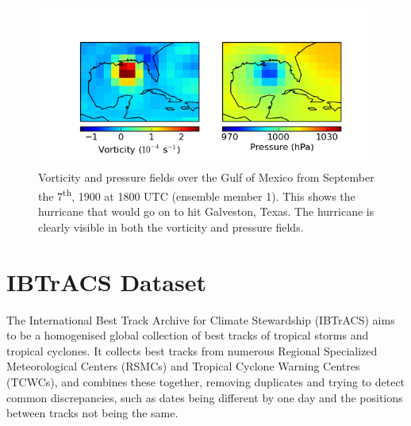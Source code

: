 \documentclass[pdftex,12pt,a4paper]{report}
\newcommand{\ts}{\textsuperscript}
\begin{document}
\begin{figure}[ht!]
    \centering
    \includegraphics[width=\textwidth]{figures/galveston_1900-9-7_18-00_em0}
    \caption{Vorticity and pressure fields over the Gulf of Mexico from September the 7\ts{th}, 1900
        at 1800 UTC (ensemble member 1). This shows the hurricane that would go on to hit
        Galveston, Texas. The hurricane is clearly visible in both the vorticity and pressure fields.}
    \label{fig:galveston}
\end{figure}


\section{IBTrACS Dataset}
\label{sec:ibtracs}
The International Best Track Archive for Climate Stewardship (IBTrACS)
\parencite{knappInternational2010} aims to be a homogenised global collection of best tracks of
tropical storms and tropical cyclones. It collects best tracks from numerous Regional Specialized
Meteorological Centers (RSMCs) and Tropical Cyclone Warning Centres (TCWCs), and combines these
together, removing duplicates and trying to detect common discrepancies, such as dates being different
by one day and the positions between tracks not being the same.
\end{document}
